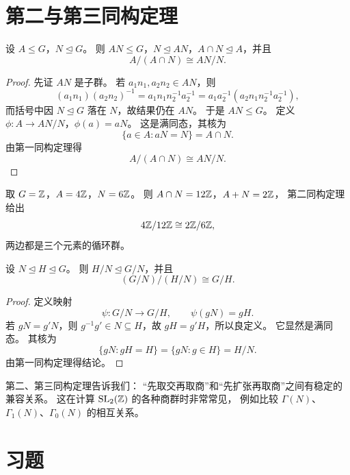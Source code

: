 \section{第二与第三同构定理}
\begin{theorem}[第二同构定理]
设 $A\le G$，$N\trianglelefteq G$。
则 $AN\le G$，$N\trianglelefteq AN$，$A\cap N\trianglelefteq A$，并且
\[ A/(A\cap N)\cong AN/N. \]
\end{theorem}
\begin{proof}
先证 $AN$ 是子群。
若 $a_1n_1,a_2n_2\in AN$，则
\[ (a_1n_1)(a_2n_2)^{-1}=a_1n_1n_2^{-1}a_2^{-1} =a_1a_2^{-1}(a_2n_1n_2^{-1}a_2^{-1}), \]
而括号中因 $N\trianglelefteq G$ 落在 $N$，故结果仍在 $AN$。
于是 $AN\le G$。
定义 $\phi:A\to AN/N$，$\phi(a)=aN$。
这是满同态，其核为
\[ \{a\in A:aN=N\}=A\cap N. \]
由第一同构定理得
\[ A/(A\cap N)\cong AN/N. \]
\end{proof}
\begin{example}
取 $G=\mathbb{Z}$，$A=4\mathbb{Z}$，$N=6\mathbb{Z}$。
则 $A\cap N=12\mathbb{Z}$，$A+N=2\mathbb{Z}$，
第二同构定理给出
\[ 4\mathbb{Z}/12\mathbb{Z}\cong 2\mathbb{Z}/6\mathbb{Z}, \]
两边都是三个元素的循环群。
\end{example}
\begin{theorem}[第三同构定理]
设 $N\trianglelefteq H\trianglelefteq G$。
则 $H/N\trianglelefteq G/N$，并且
\[ (G/N)/(H/N)\cong G/H. \]
\end{theorem}
\begin{proof}
定义映射
\[ \psi:G/N\to G/H,\qquad \psi(gN)=gH. \]
若 $gN=g'N$，则 $g^{-1}g'\in N\subseteq H$，故 $gH=g'H$，所以良定义。
它显然是满同态。
其核为
\[ \{gN:gH=H\}=\{gN:g\in H\}=H/N. \]
由第一同构定理得结论。
\end{proof}
\begin{remark}
第二、第三同构定理告诉我们：
“先取交再取商”和“先扩张再取商”之间有稳定的兼容关系。
这在计算 $\mathrm{SL}_2(\mathbb{Z})$ 的各种商群时非常常见，
例如比较 $\Gamma(N)$、$\Gamma_1(N)$、$\Gamma_0(N)$ 的相互关系。
\end{remark}
\section*{习题}

